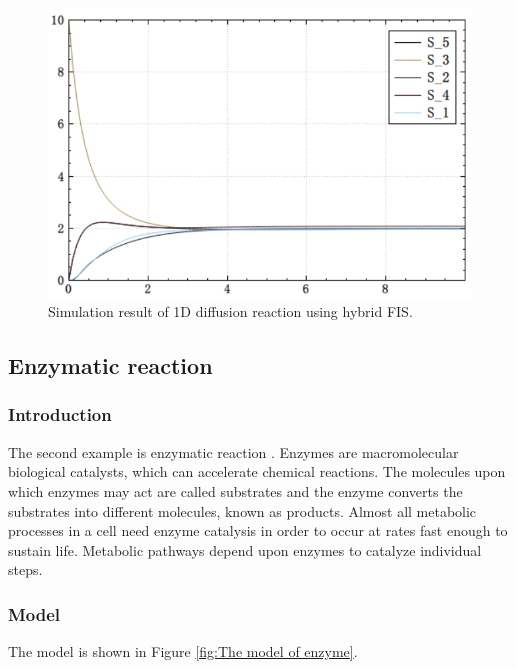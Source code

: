 \documentclass[journal,a4paper,onecolumn]{article}
\begin{document}
\begin{figure}[!hbt]
	\begin{center}
		\includegraphics[width=\columnwidth]{fig24}
		\caption{Simulation result of 1D diffusion reaction using hybrid FIS.}
		\label{fig:Simulation result of 1D diffusion reaction using hybrid FIS.}
	\end{center}
\end{figure}



\clearpage
\subsection{Enzymatic reaction}

\subsubsection{Introduction}
The second example is enzymatic reaction \cite{BHM11}. Enzymes are macromolecular biological catalysts, which can accelerate chemical reactions. The molecules upon which enzymes may act are called substrates and the enzyme converts the substrates into different molecules, known as products. Almost all metabolic processes in a cell need enzyme catalysis in order to occur at rates fast enough to sustain life. Metabolic pathways depend upon enzymes to catalyze individual steps. 

\subsubsection{Model}
The model is shown in Figure \ref{fig:The model of enzyme}.
\end{document}

